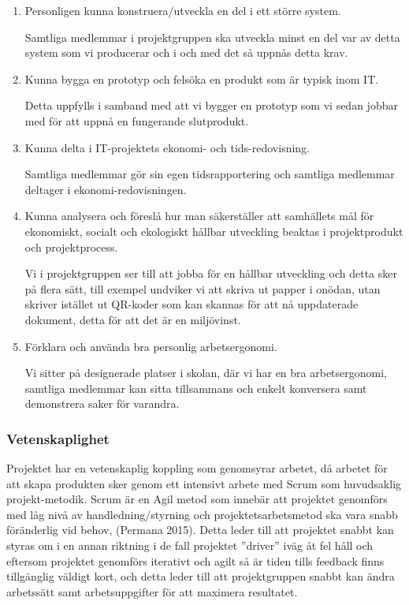 \documentclass[11pt]{article}
\begin{document}
\begin{enumerate}
\item Personligen kunna konstruera/utveckla en del i ett större system.

Samtliga medlemmar i projektgruppen ska utveckla minst en del var av
detta system som vi producerar och i och med det så uppnås detta krav.

\item Kunna bygga en prototyp och felsöka en produkt som är typisk inom IT.

Detta uppfylls i samband med att vi bygger en prototyp som vi sedan
jobbar med för att uppnå en fungerande slutprodukt.

\item Kunna delta i IT-projektets ekonomi- och tids-redovisning.

Samtliga medlemmar gör sin egen tidsrapportering och samtliga medlemmar
deltager i ekonomi-redovisningen.

\item Kunna analysera och föreslå hur man säkerställer att samhällets mål
för ekonomiskt, socialt och ekologiskt hållbar utveckling beaktas i
projektprodukt och projektprocess.

Vi i projektgruppen ser till att jobba för en hållbar utveckling och
detta sker på flera sätt, till exempel undviker vi att skriva ut papper
i onödan, utan skriver istället ut QR-koder som kan skannas för att nå
uppdaterade dokument, detta för att det är en miljövinst.

\item Förklara och använda bra personlig arbetsergonomi.

Vi sitter på designerade platser i skolan, där vi har en bra
arbetsergonomi, samtliga medlemmar kan sitta tillsammans och enkelt
konversera samt demonstrera saker för varandra.
\end{enumerate}

\subsubsection{Vetenskaplighet}
\label{sec:org31d660c}
Projektet har en vetenskaplig koppling som genomsyrar arbetet, då
arbetet för att skapa produkten sker genom ett intensivt arbete med
Scrum som huvudsaklig projekt-metodik. Scrum är en Agil metod som
innebär att projektet genomförs med låg nivå av handledning/styrning och
projektetsarbetsmetod ska vara snabb föränderlig vid behov, (Permana
2015). Detta leder till att projektet snabbt kan styras om i en annan
riktning i de fall projektet ”driver” iväg åt fel håll och eftersom
projektet genomförs iterativt och agilt så är tiden tills feedback finns
tillgänglig väldigt kort, och detta leder till att projektgruppen snabbt
kan ändra arbetssätt samt arbetsuppgifter för att maximera resultatet.
\end{document}
